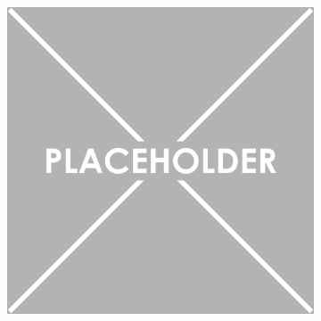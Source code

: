 \documentclass{article}
\begin{document}
\begin{figure}[ht]
\begin{subfigure}{0.4\textwidth}
    \end{subfigure}%
    \begin{subfigure}{0.4\textwidth}
        \centering
        \includegraphics[width=\linewidth]{placeholder.png}
    \end{subfigure}%

\end{figure}
\end{document}
